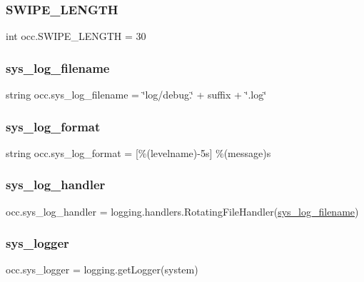 \subsubsection{\texorpdfstring{S\+W\+I\+P\+E\+\_\+\+L\+E\+N\+G\+TH}{SWIPE\_LENGTH}}
{\footnotesize\ttfamily int occ.\+S\+W\+I\+P\+E\+\_\+\+L\+E\+N\+G\+TH = 30}

\mbox{\label{namespaceocc_aa3d695ee6e11c0477ad1a3e231bc460b}} 
\subsubsection{\texorpdfstring{sys\+\_\+log\+\_\+filename}{sys\_log\_filename}}
{\footnotesize\ttfamily string occ.\+sys\+\_\+log\+\_\+filename = \char`\"{}log/debug.\char`\"{} + suffix + \char`\"{}.log\char`\"{}}

\mbox{\label{namespaceocc_a8ee3a0abd32118bdb574cf16a23630d3}} 
\subsubsection{\texorpdfstring{sys\+\_\+log\+\_\+format}{sys\_log\_format}}
{\footnotesize\ttfamily string occ.\+sys\+\_\+log\+\_\+format = \textquotesingle{}\mbox{[}\%(levelname)-\/5s\mbox{]} \%(message)s\textquotesingle{}}

\mbox{\label{namespaceocc_a348b24b53f259d2dd54db5baa553791b}} 
\subsubsection{\texorpdfstring{sys\+\_\+log\+\_\+handler}{sys\_log\_handler}}
{\footnotesize\ttfamily occ.\+sys\+\_\+log\+\_\+handler = logging.\+handlers.\+Rotating\+File\+Handler(\hyperlink{namespaceocc_aa3d695ee6e11c0477ad1a3e231bc460b}{sys\+\_\+log\+\_\+filename})}

\mbox{\label{namespaceocc_ae0c6eddc92a2aa9a7c427fd9fbdc8a9f}} 
\subsubsection{\texorpdfstring{sys\+\_\+logger}{sys\_logger}}
{\footnotesize\ttfamily occ.\+sys\+\_\+logger = logging.\+get\+Logger(\textquotesingle{}system\textquotesingle{})}

